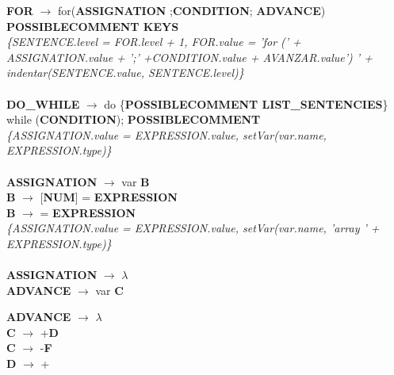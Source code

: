 \documentclass[10pt,a4paper]{article}
\begin{document}
\textbf{FOR} $\rightarrow$ for(\textbf{ASSIGNATION} ;\textbf{CONDITION}; \textbf{ADVANCE}) \textbf{POSSIBLECOMMENT KEYS}  \\

\textit{\{SENTENCE.level = FOR.level + 1, FOR.value = 'for (' + ASSIGNATION.value + ';' +CONDITION.value + AVANZAR.value') ' + indentar(SENTENCE.value, SENTENCE.level)\}} \\ \\

\textbf{DO\_WHILE} $\rightarrow$ do \{\textbf{POSSIBLECOMMENT LIST\_SENTENCIES}\} while (\textbf{CONDITION}); \textbf{POSSIBLECOMMENT} \\


\textit{\{ASSIGNATION.value = EXPRESSION.value, setVar(var.name, EXPRESSION.type)\}}  \\ \\

\textbf{ASSIGNATION} $\rightarrow$ var \textbf{B} \\

\textbf{B} $\rightarrow$ [\textbf{NUM}] = \textbf{EXPRESSION}  \\

\textbf{B} $\rightarrow$ = \textbf{EXPRESSION} \\

\textit{\{ASSIGNATION.value = EXPRESSION.value, setVar(var.name, 'array ' + EXPRESSION.type)\}}  \\ \\

\textbf{ASSIGNATION} $\rightarrow$ $\lambda$ \\


\textbf{ADVANCE} $\rightarrow$ var \textbf{C} 

\textbf{ADVANCE} $\rightarrow$ $\lambda$ \\

\textbf{C} $\rightarrow$ +\textbf{D} \\ 

\textbf{C} $\rightarrow$ -\textbf{F} \\

\textbf{D} $\rightarrow$ +   \\
\end{document}
